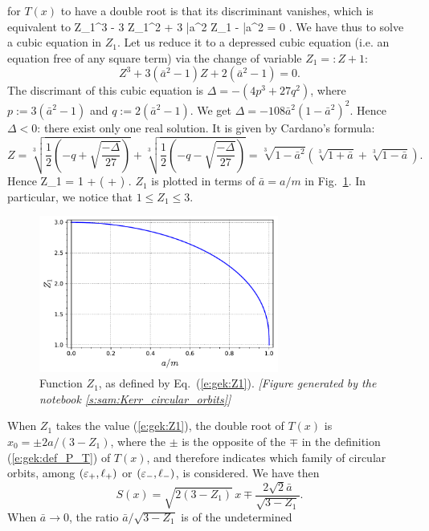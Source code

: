 for $T(x)$ to have a double root is that its discriminant vanishes, which is
equivalent to
\be \label{e:gek:cubic_Z1}
  Z_1^3 - 3 Z_1^2 + 3 \bar{a}^2 Z_1 - \bar{a}^2 = 0 .
\ee
We have thus to solve a cubic equation in $Z_1$. Let us reduce it to a depressed
cubic equation (i.e. an equation free of any square term) via the change
of variable $Z_1 =: Z + 1$:
\[
    Z^3 + 3 (\bar{a}^2 - 1) Z + 2 (\bar{a}^2 - 1) = 0 .
\]
The discrimant of this cubic equation is
$\Delta = - (4 p^3 + 27 q^2)$, where $p:= 3 (\bar{a}^2 - 1)$
and $q:=2 (\bar{a}^2 - 1)$. We get $\Delta = - 108 \bar{a}^2 (1 - \bar{a}^2)^2$.
Hence $\Delta < 0$: there exist only one real solution. It is given by
Cardano's formula:
\[
    Z = \sqrt[3]{ \frac{1}{2} \left(-q + \sqrt{\frac{-\Delta}{27}} \right) }
        + \sqrt[3]{ \frac{1}{2} \left(-q - \sqrt{\frac{-\Delta}{27}} \right) }
    = \sqrt[3]{1 - \bar{a}^2} \left( \sqrt[3]{1 + \bar{a}} + \sqrt[3]{1 - \bar{a}} \right) .
\]
Hence
\be \label{e:gek:Z1}
    Z_1 = 1 +  \left(  +  \right) .
\ee
$Z_1$ is plotted in terms of $\bar{a} = a/m$ in Fig.~\ref{f:gek:Z1}.
In particular, we notice that $1 \leq Z_1 \leq 3$.
\begin{figure}
\centerline{\includegraphics[width=0.7\textwidth]{gek_Z1.pdf}}
\caption[]{\label{f:gek:Z1} \footnotesize
Function $Z_1$, as defined by Eq.~(\ref{e:gek:Z1}).
\textsl{[Figure generated by the notebook \ref{s:sam:Kerr_circular_orbits}]}
}
\end{figure}
When $Z_1$ takes the value (\ref{e:gek:Z1}), the double root of $T(x)$ is
$x_0 = \pm {2a}/(3-Z_1)$, where the $\pm$ is the opposite of the $\mp$
in the definition (\ref{e:gek:def_P_T}) of $T(x)$, and therefore indicates
which family of  circular orbits, among $(\varepsilon_+,\ell_+)$ or $(\varepsilon_-,\ell_-)$,
is considered. We have then
\[
    S(x) = \sqrt{2(3-Z_1)} \, x \mp \frac{2\sqrt{2} \bar{a}}{\sqrt{3 - Z_1}} .
\]
When $\bar{a}\to 0$, the ratio $\bar{a}/\sqrt{3 - Z_1}$ is of the undetermined

